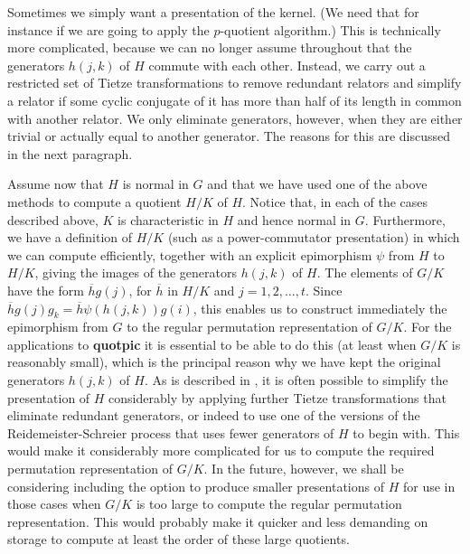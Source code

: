 Sometimes we simply want a presentation of the kernel.  (We need that for
instance if we are going to apply the $p$-quotient algorithm.) This is
technically more complicated, because we can no longer assume throughout that
the generators $h(j,k)$ of $H$ commute with each other. Instead, we carry out
a restricted set of Tietze transformations to remove redundant relators and
simplify a relator if some cyclic conjugate of it has more than half of its
length in common with another relator. We only eliminate generators, however,
when they are either trivial or actually equal to another generator.  The
reasons for this are discussed in the next paragraph.

Assume now that $H$ is normal in $G$ and that we have used one of the above
methods to compute a quotient $H/K$ of $H$. Notice that, in each of the cases
described above, $K$ is characteristic in $H$ and hence normal in $G$.
Furthermore, we have a definition of $H/K$ (such as a power-commutator
presentation) in which we can compute efficiently, together with an explicit
epimorphism $\psi $ from  $H$ to  $H/K$, giving the images of the
generators $h(j,k)$ of $H$. The elements of $G/K$ have
the form  $\overline {h}g(j)$,  for $\overline{h}$ in $H/K$ and
$j = 1,2, \ldots ,t$. Since
$\overline{h}g(j)g_k = \overline{h} \psi(h(j,k))g(i)$,
this enables us to construct immediately the
epimorphism from $G$ to the regular permutation representation of $G/K$.
For the applications to {\bf quotpic} it is essential to be able to do this
(at least when $G/K$ is reasonably small), which is the principal reason why
we have kept the original generators $h(j,k)$ of $H$. As is described in
\cite{9}, it is often possible to simplify the presentation of $H$
considerably by applying further Tietze transformations that eliminate
redundant generators, or indeed to use one of the versions of the
Reidemeister-Schreier process that uses fewer generators of $H$ to begin with.
This would make it considerably more complicated for us to compute the
required permutation representation of $G/K$.  In the future, however, we
shall be considering including the option to produce smaller presentations of
$H$ for use in those cases when $G/K$ is too large to compute the regular
permutation representation. This would probably make it quicker and
less demanding on storage to compute at least the order of these large
quotients.

